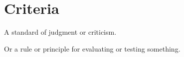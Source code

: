 \section{Criteria}
\label{sec:Criteria}

A standard of judgment or criticism. 

Or a rule or principle for evaluating or testing something.
